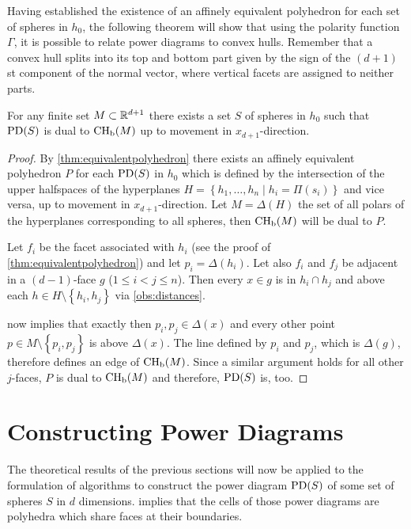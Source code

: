 Having established the existence of an affinely equivalent polyhedron for each set of spheres in $h_0$, the following theorem will show that using the polarity function $\Gamma$, it is possible to relate power diagrams to convex hulls.
Remember that a convex hull splits into its top and bottom part given by the sign of the $(d+1)$st component of the normal vector, where vertical facets are assigned to neither parts.
\begin{theorem}
    \label{thm:equivalentconvexhull}
    For any finite set $M \subset \mathbb{R}^{d+1}$ there exists a set $S$ of spheres in $h_0$ such that $\operatorname{PD}(S)$ is dual to $\operatorname{CH_b}(M)$ up to movement in $x_{d+1}$-direction.
\end{theorem}
\begin{proof}
    By \cref{thm:equivalentpolyhedron} there exists an affinely equivalent polyhedron $P$ for each $\operatorname{PD}(S)$ in $h_0$ which is defined by the intersection of the upper halfspaces of the hyperplanes $H = \left\{ h_1, \dots, h_n \mid h_i = \Pi(s_i) \right\}$ and vice versa, up to movement in $x_{d+1}$-direction.
    Let $M = \Delta(H)$ the set of all polars of the hyperplanes corresponding to all spheres, then $\operatorname{CH_b}(M)$ will be dual to $P$.

    Let $f_i$ be the facet associated with $h_i$ (see the proof of \cref{thm:equivalentpolyhedron}) and let $p_i = \Delta(h_i)$.
    Let also $f_i$ and $f_j$ be adjacent in a $(d-1)$-face $g$ ($1 \leq i < j \leq n$).
    Then every $x \in g$ is in $h_i \cap h_j$ and above each $h \in H \setminus \left\{ h_i, h_j \right\}$ via \cref{obs:distances}.

     now implies that exactly then $p_i, p_j \in \Delta(x)$ and every other point $p \in M \setminus \left\{ p_i, p_j \right\}$ is above $\Delta(x)$.
    The line defined by $p_i$ and $p_j$, which is $\Delta(g)$, therefore defines an edge of $\operatorname{CH_b}(M)$.
    Since a similar argument holds for all other $j$-faces, $P$ is dual to $\operatorname{CH_b}(M)$ and therefore, $\operatorname{PD}(S)$ is, too.
\end{proof}

\section{Constructing Power Diagrams}
\label{sec:constructing_power_diagrams}
The theoretical results of the previous sections will now be applied to the formulation of algorithms to construct the power diagram $\operatorname{PD}(S)$ of some set of spheres $S$ in $d$ dimensions.
 implies that the cells of those power diagrams are polyhedra which share faces at their boundaries.

